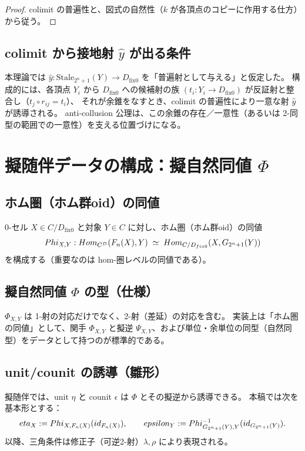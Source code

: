 \documentclass[a4paper,11pt]{article}
\begin{document}
\begin{proof}
colimit の普遍性と、図式の自然性（$k$ が各頂点のコピーに作用する仕方）から従う。
\end{proof}

\subsection{colimit から接地射 \texorpdfstring{$\hat y$}{yhat} が出る条件}
\begin{remark}
本理論では $\hat y:\mathrm{Stale}_{2^n+1}(Y)\to D_{\mathrm{fix}0}$ を「普遍射として与える」と仮定した。
構成的には、各頂点 $Y_i$ から $D_{\mathrm{fix}0}$ への候補射の族 $(t_i:Y_i\to D_{\mathrm{fix}0})$ が反証射と整合し（$t_j\circ r_{ij}=t_i$）、
それが余錐をなすとき、colimit の普遍性により一意な射 $\hat y$ が誘導される。
anti-collusion 公理は、この余錐の存在／一意性（あるいは 2-同型の範囲での一意性）を支える位置づけになる。
\end{remark}

\section{擬随伴データの構成：擬自然同値 \texorpdfstring{$\Phi$}{Phi}}
\subsection{ホム圏（ホム群oid）の同値}
\begin{definition}[擬自然同値の目標]
0-セル $X\in C/D_{\mathrm{fix}0}$ と対象 $Y\in C$ に対し、ホム圏（ホム群oid）の同値
\[
  Phi_{X,Y}:Hom_{C^D}(F_n(X),Y)\;\simeq\; Hom_{C/D_{fix0}}(X,G_{2^n+1}(Y))
\]
を構成する（重要なのは hom-圏レベルの同値である）。
\end{definition}

\subsection{擬自然同値 \texorpdfstring{$\Phi$}{Phi} の型（仕様）}
\begin{remark}
$\Phi_{X,Y}$ は 1-射の対応だけでなく、2-射（差延）の対応を含む。
実装上は「ホム圏の同値」として、関手 $\Phi_{X,Y}$ と擬逆 $\Psi_{X,Y}$、および単位・余単位の同型（自然同型）をデータとして持つのが標準的である。
\end{remark}

\subsection{unit/counit の誘導（雛形）}
\begin{remark}
擬随伴では、unit $\eta$ と counit $\epsilon$ は $\Phi$ とその擬逆から誘導できる。
本稿では次を基本形とする：
\[
  eta_X := Phi_{X,F_n(X)}(id_{F_n(X)}),
  \qquad
  epsilon_Y := Phi^{-1}_{G_{2^n+1}(Y),Y}(id_{G_{2^n+1}(Y)}).
\]
以降、三角条件は修正子（可逆2-射）$\lambda,\rho$ により表現される。
\end{remark}
\end{document}
